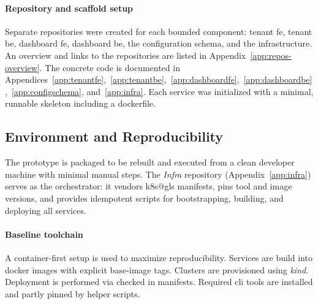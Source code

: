\documentclass[11pt, a4paper, oneside, listof=totoc]{scrartcl}
\begin{document}
            \paragraph{Repository and scaffold setup}
                Separate repositories were created for each bounded component: tenant \gls{fe},
                tenant \gls{be}, dashboard \gls{fe}, dashboard \gls{be}, the configuration schema,
                and the infrastructure.
                An overview and links to the repositories are listed in
                Appendix~\ref{app:repos-overview}.
                The concrete code is documented in
                Appendices~\ref{app:tenantfe},~\ref{app:tenantbe},~\ref{app:dashboardfe},~\ref{app:dashboardbe},~\ref{app:configschema}, and~\ref{app:infra}.
                Each service was initialized with a minimal, runnable skeleton including a
                dockerfile.

        \subsection{Environment and Reproducibility}\label{subsec:environmentAndReproducibility}
            The prototype is packaged to be rebuilt and executed from a clean developer machine with
            minimal manual steps.
            The \textit{Infra} repository (Appendix~\ref{app:infra}) serves as the orchestrator:
            it vendors \gls{k8s@gls} manifests, pins tool and image versions, and provides
            idempotent scripts for bootstrapping, building, and deploying all services.

            \paragraph{Baseline toolchain}
                A container-first setup is used to maximize reproducibility.
                Services are build into \gls{docker} images with explicit base-image tags.
                Clusters are provisioned using \textit{kind}.
                Deployment is performed via checked in manifests.
                Required \gls{cli} tools are installed and partly pinned by helper scripts.
\end{document}
